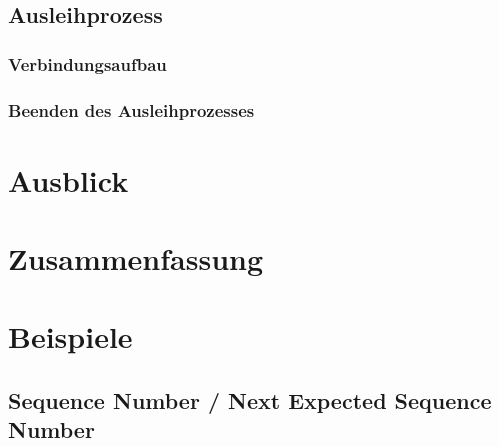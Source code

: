 \documentclass[doktyp=barbeit]{TUBAFarbeiten}
\begin{document}
	\subsection{Ausleihprozess}

		\subsubsection{Verbindungsaufbau}

		\subsubsection{Beenden des Ausleihprozesses}

\newpage
\section{Ausblick}

\newpage
\section{Zusammenfassung}

\newpage
\printbibliography[heading=bibintoc]

\newpage
\appendix

\section{Beispiele}
	\subsection{Sequence Number / Next Expected Sequence Number}
		\label{sec: anhang nesn sn}
		
\end{document}
